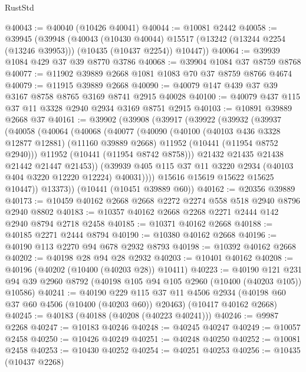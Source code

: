 \begin{lexlean}{RustStd}
\begin{coremodule}
@40043 := @40040 (@10426 @40041)
@40044 := @10081 @2442
@40058 := @39945
    (@39948
      (@40043
        (@10430 @40044)
        @15517
        (@13242 (@13244 @2254 (@13246 @39953)))
        (@10435 (@10437 @2254))
        @10447))
@40064 := @39939 @1084 @429 @37 @39 @8770 @3786
@40068 := @39904 @1084 @37 @8759 @8768
@40077 := @11902 @39889 @2668 @1081 @1083 @70 @37 @8759 @8766 @4674
@40079 := @11915 @39889 @2668
@40090 := @40079 @147 @439 @37 @39 @3167 @8758 @8765 @3169 @8741 @2915 @40028
@40100 := @40079 @437 @115 @37 @11 @3328 @2940 @2934 @3169 @8751 @2915
@40103 := @10891 @39889 @2668 @37
@40161 := @39902
    (@39908
      (@39917
        (@39922
          (@39932
            (@39937
              (@40058
                (@40064
                  (@40068
                    (@40077
                      (@40090
                        (@40100
                          (@40103 @436 @3328 @12877 @12881)
                          (@11160 @39889 @2668)
                          @11952
                          (@10441 (@11954 @8752 @2940)))
                        @11952
                        (@10441 (@11954 @8742 @8758)))
                      @21432
                      @21435
                      @21438
                      @21442
                      @21447
                      @21453))
                  (@39939 @405 @115 @37 @11 @3220 @2934 (@40103 @404 @3220 @12220 @12224) @40031))))
            @15616
            @15619
            @15622
            @15625
            @10447))
        @13373))
    (@10441 (@10451 @39889 @60))
@40162 := @20356 @39889
@40173 := @10459 @40162 @2668 @2668 @2272 @2274 @558 @518 @2940 @8796 @2940 @8802
@40183 := @10357 @40162 @2668 @2268 @2271 @2444 @142 @2940 @8794 @2718 @2458
@40185 := @10371 @40162 @2668
@40188 := @40185 @2271 @2444 @8794
@40190 := @10380 @40162 @2668
@40196 := @40190 @113 @2270 @94 @678 @2932 @8793
@40198 := @10392 @40162 @2668
@40202 := @40198 @28 @94 @28 @2932
@40203 := @10401 @40162
@40208 := @40196 (@40202 (@10400 (@40203 @28)) @10411)
@40223 := @40190
    @121
    @231
    @94
    @39
    @2960
    @8792
    (@40198 @105 @94 @105 @2960 (@10400 (@40203 @105)) @10586)
@40241 := @40190
    @229
    @115
    @37
    @11
    @4506
    @2934
    (@40198 @60 @37 @60 @4506 (@10400 (@40203 @60)) @20463)
    (@10417 @40162 @2668)
@40245 := @40183 (@40188 (@40208 (@40223 @40241)))
@40246 := @9987 @2268
@40247 := @10183 @40246
@40248 := @40245 @40247
@40249 := @10057 @2458
@40250 := @10426 @40249
@40251 := @40248 @40250
@40252 := @10081 @2458
@40253 := @10430 @40252
@40254 := @40251 @40253
@40256 := @10435 (@10437 @2268)

\end{coremodule}
\end{lexlean}
